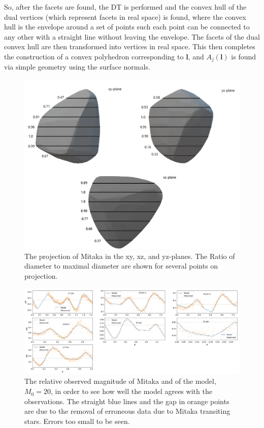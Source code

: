 \documentclass[10pt,twocolumn]{revtex4}    %
\begin{document}
So, after the facets are found, the DT is performed and the convex hull of the dual vertices (which represent facets in real space) is found, where the convex hull is the envelope around a set of points such each point can be connected to any other with a straight line without leaving the envelope. The facets of the dual convex hull are then transformed into vertices in real space. This then completes the construction of a convex polyhedron corresponding to $\textbf{l}$, and $A_j(\textbf{l})$ is found via simple geometry using the surface normals.

\begin{figure}
    \centering
    \includegraphics[width = \linewidth]{allProj.png}
    \caption{The projection of Mitaka in the xy, xz, and yz-planes. The Ratio of diameter to maximal diameter are shown for several points on projection.}
    \label{fig:allProj}
\end{figure}

\begin{figure}
    \centering
    \includegraphics[width = \linewidth]{compareLC.png}
    \caption{The relative observed magnitude of Mitaka and of the model, $M_0 = 20$, in order to see how well the model agrees with the observations. The straight blue lines and the gap in orange points are due to the removal of erroneous data due to Mitaka transiting stars. Errors too small to be seen.}
    \label{fig:compareLCS}
\end{figure}
\end{document}
